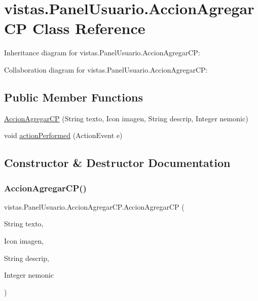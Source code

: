 \hypertarget{classvistas_1_1_panel_usuario_1_1_accion_agregar_c_p}{}\section{vistas.\+Panel\+Usuario.\+Accion\+Agregar\+CP Class Reference}
\label{classvistas_1_1_panel_usuario_1_1_accion_agregar_c_p}


Inheritance diagram for vistas.\+Panel\+Usuario.\+Accion\+Agregar\+CP\+:


Collaboration diagram for vistas.\+Panel\+Usuario.\+Accion\+Agregar\+CP\+:
\subsection*{Public Member Functions}
\begin{DoxyCompactItemize}
\item 
\mbox{\hyperlink{classvistas_1_1_panel_usuario_1_1_accion_agregar_c_p_a1579a854e88d2de04e2b024f38e54538}{Accion\+Agregar\+CP}} (String texto, Icon imagen, String descrip, Integer nemonic)
\item 
void \mbox{\hyperlink{classvistas_1_1_panel_usuario_1_1_accion_agregar_c_p_aa549660e9be2d4a07ad4ad5d13697959}{action\+Performed}} (Action\+Event e)
\end{DoxyCompactItemize}


\subsection{Constructor \& Destructor Documentation}
\mbox{\label{classvistas_1_1_panel_usuario_1_1_accion_agregar_c_p_a1579a854e88d2de04e2b024f38e54538}} 
\subsubsection{\texorpdfstring{Accion\+Agregar\+C\+P()}{AccionAgregarCP()}}
{\footnotesize\ttfamily vistas.\+Panel\+Usuario.\+Accion\+Agregar\+C\+P.\+Accion\+Agregar\+CP (\begin{DoxyParamCaption}\item[{String}]{texto,  }\item[{Icon}]{imagen,  }\item[{String}]{descrip,  }\item[{Integer}]{nemonic }\end{DoxyParamCaption})\hspace{0.3cm}{\ttfamily [inline]}}

